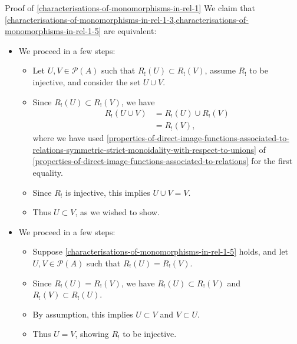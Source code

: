 \begin{Proof}{Proof of \cref{characterisations-of-monomorphisms-in-rel-1}}
    We claim that \cref{characterisations-of-monomorphisms-in-rel-1-3,characterisations-of-monomorphisms-in-rel-1-5} are equivalent:
    \begin{itemize}
        \item{}We proceed in a few steps:
            \begin{itemize}
                \item Let $U,V\in\mathcal{P}(A)$ such that $R_{!}(U)\subset R_{!}(V)$, assume $R_{!}$ to be injective, and consider the set $U\cup V$.
                \item Since $R_{!}(U)\subset R_{!}(V)$, we have
                    \begin{align*}
                        R_{!}(U\cup V) &= R_{!}(U)\cup R_{!}(V)\\
                                       &= R_{!}(V),
                    \end{align*}
                    where we have used \cref{properties-of-direct-image-functions-associated-to-relations-symmetric-strict-monoidality-with-respect-to-unions} of \cref{properties-of-direct-image-functions-associated-to-relations} for the first equality.
                \item Since $R_{!}$ is injective, this implies $U\cup V=V$.
                \item Thus $U\subset V$, as we wished to show.
            \end{itemize}
        \item{}We proceed in a few steps:
            \begin{itemize}
                \item Suppose \cref{characterisations-of-monomorphisms-in-rel-1-5} holds, and let $U,V\in\mathcal{P}(A)$ such that $R_{!}(U)=R_{!}(V)$.
                \item Since $R_{!}(U)=R_{!}(V)$, we have $R_{!}(U)\subset R_{!}(V)$ and $R_{!}(V)\subset R_{!}(U)$.
                \item By assumption, this implies $U\subset V$ and $V\subset U$.
                \item Thus $U=V$, showing $R_{!}$ to be injective.
            \end{itemize}
    \end{itemize}


\end{Proof}
